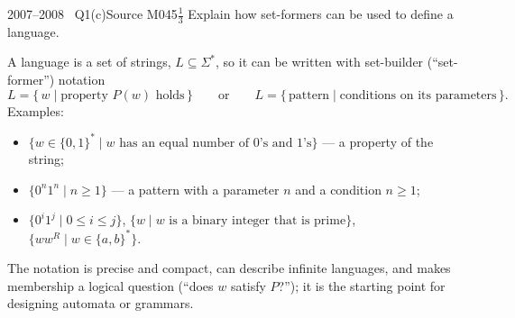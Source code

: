 \documentclass[11pt,a4paper]{article}
\begin{document}
\begin{question}{2007--2008 \textbullet\ Q1(c)}{Source M04}{5$\tfrac13$}
Explain how set-formers can be used to define a language.
\end{question}
\begin{solution}
A language is a set of strings, $L\subseteq\Sigma^*$, so it can be written with set-builder (``set-former'') notation
\[ L=\{\,w \mid \text{property } P(w) \text{ holds}\,\}\qquad\text{or}\qquad L=\{\,\text{pattern}\mid \text{conditions on its parameters}\,\}. \]
Examples:
\begin{itemize}
\item $\{w\in\{0,1\}^*\mid w \text{ has an equal number of 0's and 1's}\}$ --- a property of the string;
\item $\{0^n1^n\mid n\ge1\}$ --- a pattern with a parameter $n$ and a condition $n\ge1$;
\item $\{0^i1^j\mid 0\le i\le j\}$, $\{w\mid w \text{ is a binary integer that is prime}\}$, $\{ww^R\mid w\in\{a,b\}^*\}$.
\end{itemize}
The notation is precise and compact, can describe infinite languages, and makes membership a logical question (``does $w$ satisfy $P$?''); it is the starting point for designing automata or grammars.
\end{solution}
\end{document}
